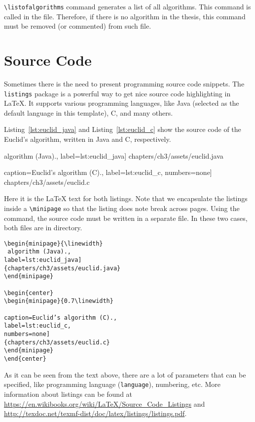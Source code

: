 \verb|\listofalgorithms| command generates a list of all algorithms. This command is called in the  file. Therefore, if there is no algorithm in the thesis, this command must be removed (or commented) from such file.

\section{Source Code}
Sometimes there is the need to present programming source code snippets.
The \verb|listings| package  is a powerful way to get nice source code highlighting in \LaTeX{}. It supports various programming languages, like Java (selected as the default language in this template), C, and many others.

Listing~\ref{lst:euclid_java} and Listing~\ref{lst:euclid_c} show the source code of the Euclid’s algorithm, written in Java and C, respectively.

\begin{minipage}{\linewidth}
 algorithm (Java).,
label=lst:euclid_java]
{chapters/ch3/assets/euclid.java}
\end{minipage}

\begin{center}
\begin{minipage}{0.7\linewidth}
 
caption=Euclid’s algorithm (C).,
label=lst:euclid_c,
numbers=none]
{chapters/ch3/assets/euclid.c}
\end{minipage}
\end{center}

Here it is the \LaTeX{} text for both listings. Note that we encapsulate the listings inside a \verb|\minipage| so that the listing does note break across pages.
Using the \verb|| command, the source code must be written in a separate file. In these two cases, both files are in  directory.

\begin{verbatim}
\begin{minipage}{\linewidth}
 algorithm (Java).,
label=lst:euclid_java]
{chapters/ch3/assets/euclid.java}
\end{minipage}

\begin{center}
\begin{minipage}{0.7\linewidth}
 
caption=Euclid’s algorithm (C).,
label=lst:euclid_c,
numbers=none]
{chapters/ch3/assets/euclid.c}
\end{minipage}
\end{center}

\end{verbatim}
As it can be seen from the text above, there are a lot of parameters that can be specified, like programming language (\verb|language|), numbering, etc.   
More information about listings can be found at 
\url{https://en.wikibooks.org/wiki/LaTeX/Source_Code_Listings} and 
\url{http://texdoc.net/texmf-dist/doc/latex/listings/listings.pdf}.


